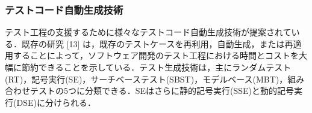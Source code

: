 \documentclass[12pt]{jarticle} %
\begin{document}

\subsubsection{テストコード自動生成技術}
テスト工程の支援するために様々なテストコード自動生成技術が提案されている．既存の研究 [13] は，既存のテストケースを再利用，自動生成，または再適用することによって，ソフトウェア開発のテスト工程における時間とコストを大幅に節約できることを示している．テスト生成技術は，主にランダムテスト(RT)，記号実行(SE)，サーチベーステスト(SBST)，モデルベース(MBT)，組み合わせテストの5つに分類できる．SEはさらに静的記号実行(SSE)と動的記号実行(DSE)に分けられる．
\end{document}
